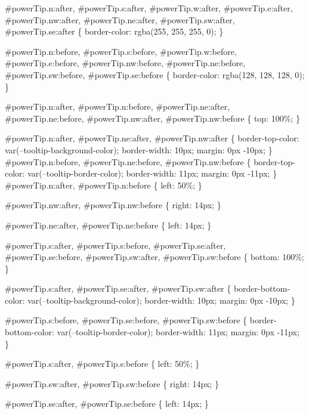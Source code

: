 \#power\+Tip.\+n\+:after, \#power\+Tip.\+s\+:after, \#power\+Tip.\+w\+:after, \#power\+Tip.\+e\+:after, \#power\+Tip.\+nw\+:after, \#power\+Tip.\+ne\+:after, \#power\+Tip.\+sw\+:after, \#power\+Tip.\+se\+:after \{ border-\/color\+: rgba(255, 255, 255, 0); \}

\#power\+Tip.\+n\+:before, \#power\+Tip.\+s\+:before, \#power\+Tip.\+w\+:before, \#power\+Tip.\+e\+:before, \#power\+Tip.\+nw\+:before, \#power\+Tip.\+ne\+:before, \#power\+Tip.\+sw\+:before, \#power\+Tip.\+se\+:before \{ border-\/color\+: rgba(128, 128, 128, 0); \}

\#power\+Tip.\+n\+:after, \#power\+Tip.\+n\+:before, \#power\+Tip.\+ne\+:after, \#power\+Tip.\+ne\+:before, \#power\+Tip.\+nw\+:after, \#power\+Tip.\+nw\+:before \{ top\+: 100\%; \}

\#power\+Tip.\+n\+:after, \#power\+Tip.\+ne\+:after, \#power\+Tip.\+nw\+:after \{ border-\/top-\/color\+: var(--tooltip-\/background-\/color); border-\/width\+: 10px; margin\+: 0px -\/10px; \} \#power\+Tip.\+n\+:before, \#power\+Tip.\+ne\+:before, \#power\+Tip.\+nw\+:before \{ border-\/top-\/color\+: var(--tooltip-\/border-\/color); border-\/width\+: 11px; margin\+: 0px -\/11px; \} \#power\+Tip.\+n\+:after, \#power\+Tip.\+n\+:before \{ left\+: 50\%; \}

\#power\+Tip.\+nw\+:after, \#power\+Tip.\+nw\+:before \{ right\+: 14px; \}

\#power\+Tip.\+ne\+:after, \#power\+Tip.\+ne\+:before \{ left\+: 14px; \}

\#power\+Tip.\+s\+:after, \#power\+Tip.\+s\+:before, \#power\+Tip.\+se\+:after, \#power\+Tip.\+se\+:before, \#power\+Tip.\+sw\+:after, \#power\+Tip.\+sw\+:before \{ bottom\+: 100\%; \}

\#power\+Tip.\+s\+:after, \#power\+Tip.\+se\+:after, \#power\+Tip.\+sw\+:after \{ border-\/bottom-\/color\+: var(--tooltip-\/background-\/color); border-\/width\+: 10px; margin\+: 0px -\/10px; \}

\#power\+Tip.\+s\+:before, \#power\+Tip.\+se\+:before, \#power\+Tip.\+sw\+:before \{ border-\/bottom-\/color\+: var(--tooltip-\/border-\/color); border-\/width\+: 11px; margin\+: 0px -\/11px; \}

\#power\+Tip.\+s\+:after, \#power\+Tip.\+s\+:before \{ left\+: 50\%; \}

\#power\+Tip.\+sw\+:after, \#power\+Tip.\+sw\+:before \{ right\+: 14px; \}

\#power\+Tip.\+se\+:after, \#power\+Tip.\+se\+:before \{ left\+: 14px; \}

